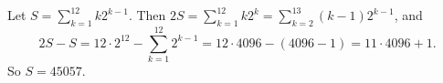 Let $S=\sum_{k=1}^{12}k2^{k-1}$. Then $2S=\sum_{k=1}^{12}k2^k=\sum_{k=2}^{13}(k-1)2^{k-1}$, and
\[2S-S=12\cdot2^{12}-\sum_{k=1}^{12}2^{k-1}=12\cdot4096-(4096-1)=11\cdot4096+1.\]
So $S=\boxed{45057}$.
